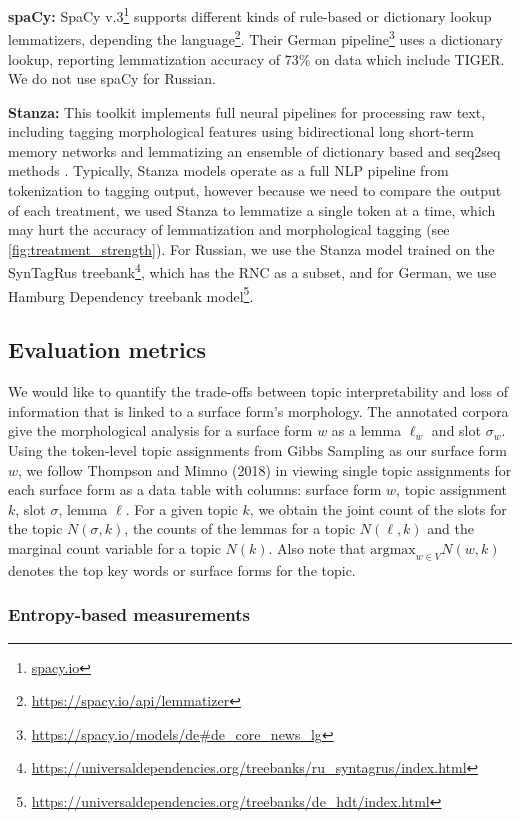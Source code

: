 \documentclass[11pt,a4paper]{article}
\newcommand{\argmax}{\mathrm{argmax}}
\begin{document}
\textbf{spaCy:} SpaCy v.3\footnote{\url{spacy.io}} supports different kinds of rule-based or dictionary lookup lemmatizers, depending the language\footnote{\url{https://spacy.io/api/lemmatizer}}. Their German pipeline\footnote{\url{https://spacy.io/models/de\#de\_core\_news\_lg}} uses a dictionary lookup, reporting lemmatization accuracy of 73\% on data which include TIGER. We do not use spaCy for Russian.


\textbf{Stanza:} This toolkit implements full neural pipelines for processing raw text, including tagging morphological features using bidirectional long short-term memory networks and lemmatizing an ensemble of dictionary based and seq2seq methods \cite{qi2020stanza}. Typically, Stanza models operate as a full NLP pipeline from tokenization to tagging output, however because we need to compare the output of each treatment, we used Stanza to lemmatize a single token at a time, which may hurt the accuracy of lemmatization and morphological tagging (see \ref{fig:treatment_strength}). For Russian, we use the Stanza model trained on the SynTagRus treebank\footnote{\url{https://universaldependencies.org/treebanks/ru_syntagrus/index.html}}, which has the RNC as a subset, and for German, we use Hamburg Dependency treebank model\footnote{\url{https://universaldependencies.org/treebanks/de_hdt/index.html}}.

\subsection{Evaluation metrics}
We would like to quantify the trade-offs between topic interpretability and loss of information that is linked to a surface form's morphology. The annotated corpora give the morphological analysis for a surface form $w$ as a lemma $\ell_w$ and slot $\sigma_w$. Using the token-level topic assignments from Gibbs Sampling as our surface form $w$, we follow Thompson and Mimno (2018) in viewing single topic assignments for each surface form as a data table with columns: surface form $w$, topic assignment $k$, slot $\sigma$, lemma $\ell$. For a given topic $k$, we obtain the joint count of the slots for the topic $N(\sigma, k)$, the counts of the lemmas for a topic $N(\ell, k)$ and the marginal count variable for a topic $N(k)$. Also note that $\argmax_{w \in V} N(w, k)$ denotes the top key words or surface forms for the topic.

\subsubsection{Entropy-based measurements}
\end{document}
